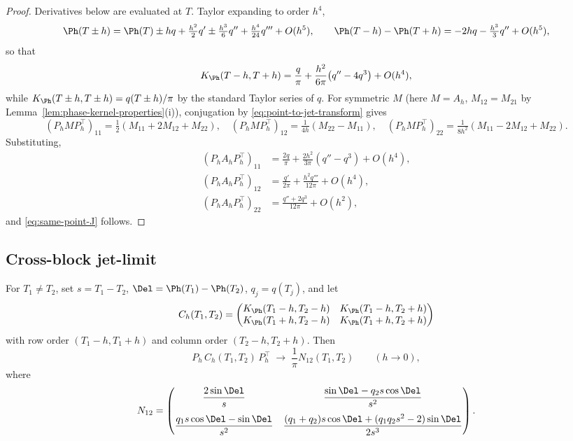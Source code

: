 \begin{proof}
Derivatives below are evaluated at \(T\).  Taylor expanding to order
\(h^4\),
\[
\Ph(T\pm h) = \Ph(T) \pm hq + \tfrac{h^2}{2}q' \pm \tfrac{h^3}{6}q''
            + \tfrac{h^4}{24}q''' + O(h^5),
\qquad
\Ph(T-h) - \Ph(T+h) = -2hq - \tfrac{h^3}{3}q'' + O(h^5),
\]
so that
\begin{equation}
\label{eq:A12-same-point-expansion}
K_\Ph(T-h,T+h)
= \frac{q}{\pi} + \frac{h^2}{6\pi}\bigl(q'' - 4q^3\bigr) + O(h^4),
\end{equation}
while \(K_\Ph(T\pm h,T\pm h) = q(T\pm h)/\pi\) by the standard Taylor
series of \(q\).  For symmetric \(M\) (here \(M=A_h\),
\(M_{12}=M_{21}\) by Lemma~\ref{lem:phase-kernel-properties}(i)),
conjugation by \eqref{eq:point-to-jet-transform} gives
\begin{equation}
\label{eq:Ph-conjugation-symmetric}
(P_h M P_h^\top)_{11} = \tfrac12(M_{11}+2M_{12}+M_{22}),\quad
(P_h M P_h^\top)_{12} = \tfrac{1}{4h}(M_{22}-M_{11}),\quad
(P_h M P_h^\top)_{22} = \tfrac{1}{8h^2}(M_{11}-2M_{12}+M_{22}).
\end{equation}
Substituting,
\begin{align*}
(P_h A_h P_h^\top)_{11}
&= \frac{2q}{\pi} + \frac{2h^2}{3\pi}(q''-q^3) + O(h^4),\\
(P_h A_h P_h^\top)_{12}
&= \frac{q'}{2\pi} + \frac{h^2 q'''}{12\pi} + O(h^4),\\
(P_h A_h P_h^\top)_{22}
&= \frac{q''+2q^3}{12\pi} + O(h^2),
\end{align*}
and \eqref{eq:same-point-J} follows.
\end{proof}

\subsection{Cross-block jet-limit}
\label{subsec:cross-block-jet-limit}

\begin{lemma}
\label{lem:cross-block-jet-limit}
For \(T_1\ne T_2\), set \(s=T_1-T_2\), \(\Del=\Ph(T_1)-\Ph(T_2)\),
\(q_j=q(T_j)\), and let
\[
C_h(T_1,T_2)=
\begin{pmatrix}
K_\Ph(T_1-h,T_2-h) & K_\Ph(T_1-h,T_2+h)\\
K_\Ph(T_1+h,T_2-h) & K_\Ph(T_1+h,T_2+h)
\end{pmatrix}
\]
with row order \((T_1-h,T_1+h)\) and column order \((T_2-h,T_2+h)\).
Then
\[
P_h\,C_h(T_1,T_2)\,P_h^\top \;\longrightarrow\;
\frac1\pi N_{12}(T_1,T_2)
\qquad (h\to 0),
\]
where
\begin{equation}
\label{eq:cross-N12}
N_{12}=
\begin{pmatrix}
\dfrac{2\sin\Del}{s}
&
\dfrac{\sin\Del - q_2 s\cos\Del}{s^2}
\\[2.4ex]
\dfrac{q_1 s\cos\Del - \sin\Del}{s^2}
&
\dfrac{(q_1+q_2)s\cos\Del + (q_1 q_2 s^2 - 2)\sin\Del}{2s^3}
\end{pmatrix}.
\end{equation}
\end{lemma}

